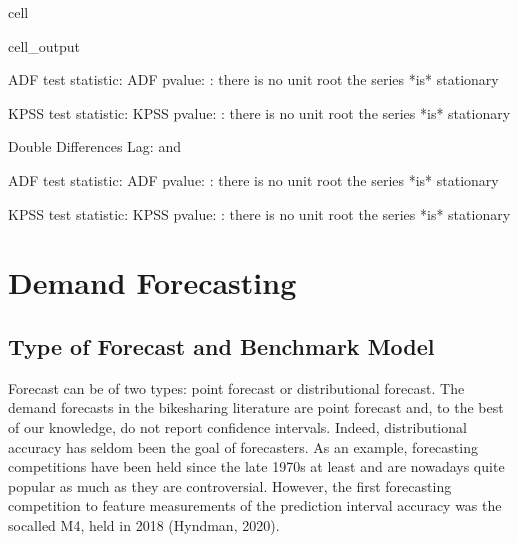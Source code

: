 \documentclass[letterpaper,10pt,english]{jupyterBook}
\begin{document}
\begin{sphinxuseclass}{cell}
\begin{sphinxuseclass}{cell_output}
\begin{sphinxVerbatim}[commandchars=\\\{\}]
ADF test statistic:  ADF p\PYGZhy{}value: \PYGZpc{}:
there is no unit root \PYGZhy{} the series *is* stationary

KPSS test statistic:  KPSS p\PYGZhy{}value: \PYGZpc{}:
there is no unit root \PYGZhy{} the series *is* stationary
\end{sphinxVerbatim}

\begin{sphinxVerbatim}[commandchars=\\\{\}]
Double Differences Lag:  and 
\end{sphinxVerbatim}

\begin{sphinxVerbatim}[commandchars=\\\{\}]
ADF test statistic:  ADF p\PYGZhy{}value: \PYGZpc{}:
there is no unit root \PYGZhy{} the series *is* stationary

KPSS test statistic:  KPSS p\PYGZhy{}value: \PYGZpc{}:
there is no unit root \PYGZhy{} the series *is* stationary
\end{sphinxVerbatim}

\end{sphinxuseclass}
\end{sphinxuseclass}

\chapter{Demand Forecasting}
\label{\detokenize{06-forecasting:demand-forecasting}}\label{\detokenize{06-forecasting::doc}}

\section{Type of Forecast and Benchmark Model}
\label{\detokenize{06-forecasting:type-of-forecast-and-benchmark-model}}
\sphinxAtStartPar
Forecast can be of two types: point forecast or distributional forecast. The demand forecasts in the bike\sphinxhyphen{}sharing literature are point forecast and, to the best of our knowledge, do not report confidence intervals. Indeed, distributional accuracy has seldom been the goal of forecasters. As an example, forecasting competitions have been held since the late 1970s at least and are nowadays quite popular \sphinxhyphen{} as much as they are controversial. However, the first forecasting competition to feature measurements of the prediction interval accuracy was the so\sphinxhyphen{}called M4, held in 2018 (Hyndman, 2020).
\end{document}
